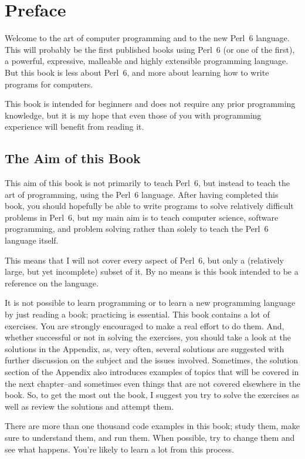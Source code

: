 
\chapter{Preface}

Welcome to the art of computer programming and to the 
new Perl~6 language. This will probably be 
the first published books using Perl~6 (or one of the first), 
a powerful, expressive, malleable and highly extensible 
programming language. But this book is less 
about Perl~6, and more about learning 
how to write programs for computers. 

This book is intended for beginners and does not require 
any prior programming knowledge, but it is my hope 
that even those of you with programming experience will 
benefit from reading it.

\section*{The Aim of this Book}

This aim of this book is not primarily to teach Perl~6, 
but instead to teach the art 
of programming, using the Perl~6 language. After having 
completed this book, you should hopefully be able 
to write programs to solve relatively difficult problems in 
Perl~6, but my main aim is to teach computer science, software 
programming, and problem solving rather than solely to teach 
the Perl~6 language itself. 

This means that I will not cover every aspect of Perl~6, but 
only a (relatively large, but yet incomplete) subset of it. 
By no means is this book intended to be a reference on the 
language.

It is not possible to learn programming or to learn a new 
programming language by just reading a book; practicing 
is essential. This book contains a lot of exercises. You 
are strongly encouraged to make a real effort to do them. And, 
whether successful or not in solving the exercises, you 
should take a look at the solutions in the Appendix, 
as, very often, several solutions are suggested with further 
discussion on the subject and the issues involved. Sometimes, the solution 
section of the Appendix also introduces examples of topics 
that will be covered in the next chapter--and sometimes even 
things that are not covered elsewhere in the book. So, to get 
the most out the book, I suggest you try to solve the exercises 
as well as review the solutions and attempt them.

There are more than one thousand code examples in this book; 
study them, make sure to understand them, and run them. When 
possible, try to change them and see what happens. You're 
likely to learn a lot from this process.


